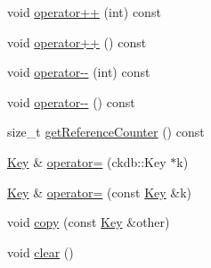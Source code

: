 \begin{DoxyCompactItemize}
void \hyperlink{classkdb_1_1Key_a31f7139c5378b3fde4dfab4955208d23}{operator++} (int) const 
\begin{DoxyCompactList}\small\item\em \end{DoxyCompactList}\item 
void \hyperlink{classkdb_1_1Key_ab017ed5e104e441d86725f61439d1f24}{operator++} () const 
\begin{DoxyCompactList}\small\item\em \end{DoxyCompactList}\item 
void \hyperlink{classkdb_1_1Key_acbb63da4ab49c66c851228511c000ec7}{operator-\/-\/} (int) const 
\begin{DoxyCompactList}\small\item\em \end{DoxyCompactList}\item 
void \hyperlink{classkdb_1_1Key_afa095fe7021b7ca01e6224b976449b3f}{operator-\/-\/} () const 
\begin{DoxyCompactList}\small\item\em \end{DoxyCompactList}\item 
size\-\_\-t \hyperlink{classkdb_1_1Key_a035020417160733aeb58c188f09ff647}{get\-Reference\-Counter} () const 
\begin{DoxyCompactList}\small\item\em \end{DoxyCompactList}\item 
\hyperlink{classkdb_1_1Key}{Key} \& \hyperlink{classkdb_1_1Key_a628f3ee543a1d71d4488233018eddd86}{operator=} (ckdb\-::\-Key $\ast$k)
\item 
\hyperlink{classkdb_1_1Key}{Key} \& \hyperlink{classkdb_1_1Key_a63a006c140cfd2a633c6fdf3f9eb9d1a}{operator=} (const \hyperlink{classkdb_1_1Key}{Key} \&k)
\item 
void \hyperlink{classkdb_1_1Key_ab5bc93e22f4cf40b9d2b1fc32cc260be}{copy} (const \hyperlink{classkdb_1_1Key}{Key} \&other)
\begin{DoxyCompactList}\small\item\em \end{DoxyCompactList}\item 
void \hyperlink{classkdb_1_1Key_a33a112681b0b2e94e6d369c0f89e361b}{clear} ()
\begin{DoxyCompactList}\small\item\em \end{DoxyCompactList}\item 

\end{DoxyCompactItemize}
